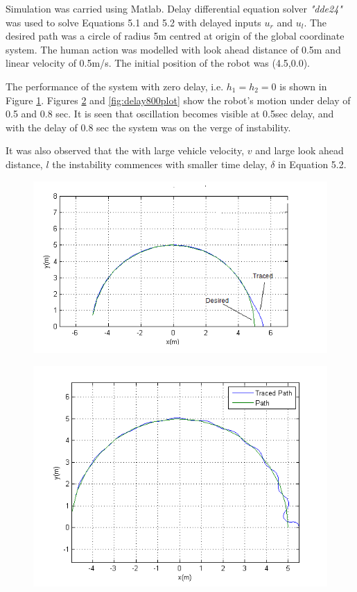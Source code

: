 Simulation was carried using Matlab. Delay differential equation solver \textit{"dde24"} was used to solve Equations 5.1 and 5.2 with delayed inputs $u_r$ and $u_l$.  The desired path  was a circle of radius 5m centred at origin of the global coordinate system. The human action was modelled with look ahead distance of 0.5m and linear velocity of 0.5m/s. The initial position of the robot was (4.5,0.0).

 The  performance of the system with zero delay, i.e. $h_1=h_2=0$ is shown in Figure \ref{fig:nodelayplot}. Figures \ref{fig:delay500plot} and \ref{fig:delay800plot} show the   robot's motion under delay of 0.5 and 0.8 sec.  It is seen that oscillation becomes visible at 0.5sec delay, and with the delay of  0.8 sec the system was on the verge of instability. 
 
 It was also observed that the with large vehicle velocity, $v$ and large look ahead distance, $l$ the instability commences with smaller time delay, $\delta$ in Equation 5.2.  
\begin{figure}[h]
	\includegraphics[width=\linewidth,keepaspectratio]{Chapter6/fig/noDelay}
	\label{fig:nodelayplot} 
\end{figure} 
\begin{figure}[h]
	\includegraphics[width=\linewidth,keepaspectratio]{Chapter6/fig/Delay500milsec}
	\label{fig:delay500plot} 
\end{figure} 
